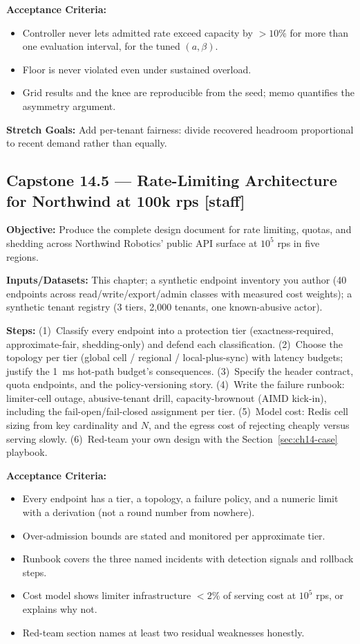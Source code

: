 \textbf{Acceptance Criteria:}
\begin{itemize}
  \item[$\square$] Controller never lets admitted rate exceed capacity by
        $>10\%$ for more than one evaluation interval, for the tuned
        $(a, \beta)$.
  \item[$\square$] Floor is never violated even under sustained overload.
  \item[$\square$] Grid results and the knee are reproducible from the
        seed; memo quantifies the asymmetry argument.
\end{itemize}

\textbf{Stretch Goals:} Add per-tenant fairness: divide recovered headroom
proportional to recent demand rather than equally.

\subsection*{Capstone 14.5 --- Rate-Limiting Architecture for Northwind at
100k rps \hfill [staff]}
\textbf{Objective:} Produce the complete design document for rate limiting,
quotas, and shedding across Northwind Robotics' public API surface at
$10^5$ rps in five regions.

\textbf{Inputs/Datasets:} This chapter; a synthetic endpoint inventory you
author (40 endpoints across read/write/export/admin classes with measured
cost weights); a synthetic tenant registry (3 tiers, 2{,}000 tenants, one
known-abusive actor).

\textbf{Steps:} (1)~Classify every endpoint into a protection tier
(exactness-required, approximate-fair, shedding-only) and defend each
classification. (2)~Choose the topology per tier (global cell / regional /
local-plus-sync) with latency budgets; justify the 1~ms hot-path budget's
consequences. (3)~Specify the header contract, quota endpoints, and the
policy-versioning story. (4)~Write the failure runbook: limiter-cell
outage, abusive-tenant drill, capacity-brownout (AIMD kick-in), including
the fail-open/fail-closed assignment per tier. (5)~Model cost: Redis cell
sizing from key cardinality and $N$, and the egress cost of rejecting
cheaply versus serving slowly. (6)~Red-team your own design with the
Section~\ref{sec:ch14-case} playbook.

\textbf{Acceptance Criteria:}
\begin{itemize}
  \item[$\square$] Every endpoint has a tier, a topology, a failure policy,
        and a numeric limit with a derivation (not a round number from
        nowhere).
  \item[$\square$] Over-admission bounds are stated and monitored per
        approximate tier.
  \item[$\square$] Runbook covers the three named incidents with detection
        signals and rollback steps.
  \item[$\square$] Cost model shows limiter infrastructure $< 2\%$ of
        serving cost at $10^5$ rps, or explains why not.
  \item[$\square$] Red-team section names at least two residual weaknesses
        honestly.
\end{itemize}

